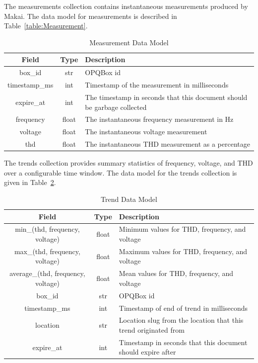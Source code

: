 The measurements collection contains instantaneous measurements produced by Makai. The data model for measurements is described in Table~\ref{table:Measurement}.

\begin{table}[H]
	\centering
	\caption{Measurement Data Model}
	\begin{tabular}{|c|c|p{8cm}|}
		\hline
		Field & Type & Description \\
		\hline
		box\_id & str & OPQBox id \\
		\hline
		timestamp\_ms & int & Timestamp of the measurement in milliseconds \\
		\hline
		expire\_at & int & The timestamp in seconds that this document should be garbage collected \\
		\hline
		frequency & float & The instantaneous frequency measurement in Hz \\
		\hline
		voltage & float & The instantaneous voltage measurement \\
		\hline
		thd & float & The instantaneous THD measurement as a percentage \\
		\hline
	\end{tabular}
	\label{table:Measurements}
\end{table}

The trends collection provides summary statistics of frequency, voltage, and THD over a configurable time window. The data model for the trends collection is given in Table~\ref{table:Trends}.

\begin{table}[H]
	\centering
	\caption{Trend Data Model}
	\begin{tabular}{|c|c|p{8cm}|}
		\hline
		Field & Type & Description \\
		\hline
		min\_(thd, frequency, voltage) & float & Minimum values for THD, frequency, and voltage \\
		\hline
		max\_(thd, frequency, voltage) & float & Maximum values for THD, frequency, and voltage \\
		\hline
		average\_(thd, frequency, voltage) & float & Mean values for THD, frequency, and voltage \\
		\hline
		box\_id & str & OPQBox id \\
		\hline
		timestamp\_ms & int & Timestamp of end of trend in milliseconds \\
		\hline
		location & str & Location slug from the location that this trend originated from \\
		\hline
		expire\_at & int & Timestamp in seconds that this document should expire after \\
		\hline
	\end{tabular}
	\label{table:Trends}
\end{table}

